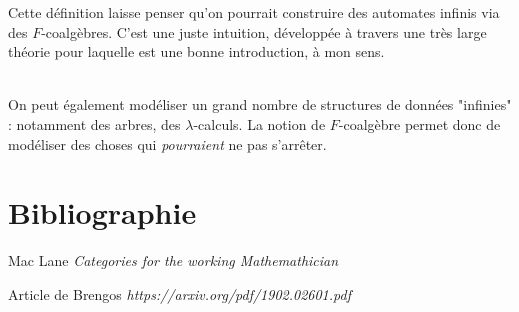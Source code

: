 \documentclass{article}
\begin{document}
Cette définition laisse penser qu'on pourrait construire des automates infinis via des $F$-coalgèbres. C'est une juste intuition, développée à travers une très large théorie pour laquelle \cite{Cet article} est une bonne introduction, à mon sens. 

\\ 

On peut également modéliser un grand nombre de structures de données "infinies" : notamment des arbres, des $\lambda$-calculs. La notion de $F$-coalgèbre permet donc de modéliser des choses qui \textit{pourraient} ne pas s'arrêter. 
    
\section{Bibliographie}

\begin{thebibliography}{9}

Mac Lane \emph{Categories for the working Mathemathician}

Article de Brengos \emph{https://arxiv.org/pdf/1902.02601.pdf}


\end{thebibliography}
\end{document}
